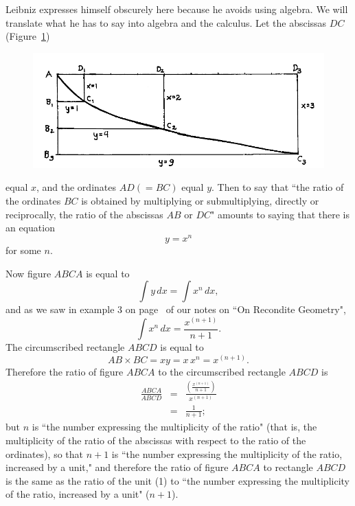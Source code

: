 \documentclass[polutonikogreek,english,twoside,openright]{article}
\newlength{\oldjot}
\begin{document}
Leibniz expresses himself obscurely here because he avoids using
algebra.  We will translate what he has to say into algebra and the
calculus.  Let the abscissas $DC$ (Figure~\ref{parquad})
\begin{figure}[htp]
  \begin{center}
    \includegraphics[width=\textwidth]{fig/Figure57}
    \caption{}
    \label{parquad}
    \vspace{-10pt}
  \end{center}
\end{figure}
equal $x$, and the ordinates $AD (= BC)$ equal $y$.  Then to say that
``the ratio of the ordinates $BC$ is obtained by multiplying or
submultiplying, directly or reciprocally, the ratio of the abscissas
$AB$ or $DC$" amounts to saying that there is an equation
$$y = x^n$$
for some $n$.  

Now figure $ABCA$ is equal to 
$$\int\! y\,dx = \int\! x^n\,dx,$$
and as we saw in example 3 on page~\pageref{intxn} of our notes on
``On Recondite Geometry",
$$\int\! x^n\,dx = \frac{x^{(n+1)}}{n+1}.$$
The circumscribed rectangle $ABCD$ is equal to 
$$AB \times BC = xy = x\,x^n = x^{(n+1)}.$$
Therefore the ratio of figure $ABCA$ to the circumscribed rectangle
$ABCD$ is
\setlength{\jot}{2ex}
\begin{eqnarray*}
  \frac{ABCA}{ABCD} & = & \frac{\left(\frac{x^{(n+1)}}{n+1}\right)}{x^{(n+1)}}\\
                    & = & \frac{1}{n+1};
\end{eqnarray*}
\setlength{\jot}{\oldjot}
\hspace{-.33em}but $n$ is ``the number expressing the multiplicity of
the ratio" (that is, the multiplicity of the ratio of the abscissas
with respect to the ratio of the ordinates), so that $n+1$ is ``the
number expressing the multiplicity of the ratio, increased by a unit,"
and therefore the ratio of figure $ABCA$ to rectangle $ABCD$ is the
same as the ratio of the unit (1) to ``the number expressing the
multiplicity of the ratio, increased by a unit" ($n+1$).
\end{document}
